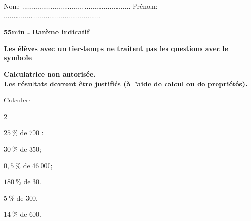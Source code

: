 \documentclass[11pt,a4paper]{article}  %
\begin{document}
	\graphicspath{{images/}}
	
	\noindent Nom: ${\scriptstyle  .........................................................}$ \hskip 1.8cm Prénom: ${\scriptstyle  ...................................................}$ 
	
	\vspace{.5cm}
	
	\begin{center}
		
		
	\end{center}

\begin{center}\textbf{55min - Barème indicatif}\end{center}
\begin{center}\textbf{Les élèves avec un tier-temps ne traitent pas les questions avec  le symbole }\end{center}
\begin{center}\textbf{Calculatrice non autorisée.\\Les résultats devront être justifiés (à l'aide de calcul ou de propriétés).}\end{center}




Calculer:
\begin{multicols}{2}
	\begin{enumMet}
		\item $25\ \%$ de $700$ ;
		\item {} $30\ \%$ de $350$;
		\item $0,5\ \%$ de $46\ 000$;
		\item $180\ \%$ de $30$.
		\item $5\ \%$ de $300$.
		\item $14\ \%$ de $600$.
	\end{enumMet}
\end{multicols}
\end{document}
